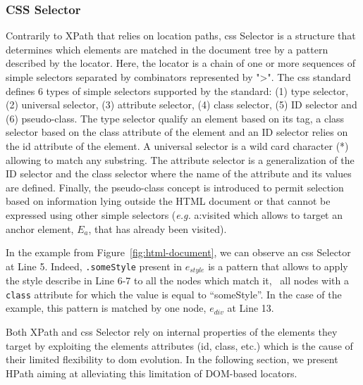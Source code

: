\subsubsection{CSS Selector}
\label{sec:hpath-introduction-css-selector}

Contrarily to XPath that relies on location paths, \gls{css} Selector is a structure that determines which elements are matched in the document tree by a pattern described by the locator. Here, the locator is a chain of one or more sequences of simple selectors separated by combinators\cite{W3C2018} represented by ">". The \gls{css} standard defines 6 types of simple selectors supported by the standard: (1) type selector, (2) universal selector, (3) attribute selector, (4) class selector, (5) ID selector and (6) pseudo-class. The type selector qualify an element based on its tag, a class selector based on the class attribute of the element and an ID selector relies on the id attribute of the element. A universal selector is a wild card character (*) allowing to match any substring. The attribute selector is a generalization of the ID selector and the class selector where the name of the attribute and its values are defined. Finally, the pseudo-class concept is introduced to permit selection based on information lying outside the HTML document or that cannot be expressed using other simple selectors (\emph{e.g.} a:visited which allows to target an anchor element, $E_a$, that has already been visited).

In the example from Figure~\ref{fig:html-document}, we can observe an \gls{css} Selector at Line 5. Indeed, \texttt{.someStyle} present in $e_{style}$ is a pattern that allows to apply the style describe in Line 6-7 to all the nodes which match it, \ie\ all nodes with a \texttt{class} attribute for which the value is equal to ``someStyle''. In the case of the example, this pattern is matched by one node, $e_{div}$ at Line 13. 

Both XPath and \gls{css} Selector rely on internal properties of the elements they target by exploiting the elements attributes (id, class, etc.) which is the cause of their limited flexibility to \gls{dom} evolution. In the following section, we present HPath aiming at alleviating this limitation of DOM-based locators.